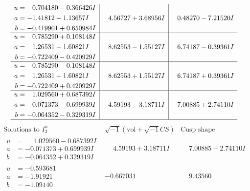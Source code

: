 \documentclass[1p]{elsarticle_modified}
\theoremstyle{definition}
\newcommand{\I}{\sqrt{-1}}
\begin{document}
$$\begin{array}{c|c|c}
\begin{aligned}
u &= \phantom{-}0.704180 - 0.366426 I \\
a &= -1.41812 + 1.13657 I \\
b &= -0.419901 + 0.650984 I\end{aligned}
 & \phantom{-}4.56727 + 3.68956 I & \phantom{-}0.48270 - 7.21520 I \\ \hline\begin{aligned}
u &= \phantom{-}0.785290 + 0.108148 I \\
a &= \phantom{-}1.26531 - 1.60821 I \\
b &= -0.722409 - 0.420929 I\end{aligned}
 & \phantom{-}8.62553 - 1.55127 I & \phantom{-}6.74187 - 0.39361 I \\ \hline\begin{aligned}
u &= \phantom{-}0.785290 - 0.108148 I \\
a &= \phantom{-}1.26531 + 1.60821 I \\
b &= -0.722409 + 0.420929 I\end{aligned}
 & \phantom{-}8.62553 + 1.55127 I & \phantom{-}6.74187 + 0.39361 I \\ \hline\begin{aligned}
u &= \phantom{-}1.029560 + 0.687392 I \\
a &= -0.071373 - 0.699939 I \\
b &= -0.064352 - 0.329319 I\end{aligned}
 & \phantom{-}4.59193 - 3.18711 I & \phantom{-}7.00885 + 2.74110 I\\
 \hline 
 \end{array}$$\newpage$$\begin{array}{c|c|c}  
\text{Solutions to }I^u_{2}& \I (\text{vol} + \sqrt{-1}CS) & \text{Cusp shape}\\
 \hline 
\begin{aligned}
u &= \phantom{-}1.029560 - 0.687392 I \\
a &= -0.071373 + 0.699939 I \\
b &= -0.064352 + 0.329319 I\end{aligned}
 & \phantom{-}4.59193 + 3.18711 I & \phantom{-}7.00885 - 2.74110 I \\ \hline\begin{aligned}
u &= -0.593681\phantom{ +0.000000I} \\
a &= -1.91921\phantom{ +0.000000I} \\
b &= -1.09140\phantom{ +0.000000I}\end{aligned}
 & -0.667031\phantom{ +0.000000I} & \phantom{-}9.43560\phantom{ +0.000000I} \\ \hline\begin{aligned}

\end{aligned}
\end{array}$$
\end{document}
